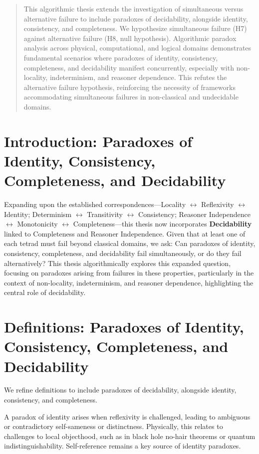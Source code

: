 \begin{abstract}
		This algorithmic thesis extends the investigation of simultaneous versus alternative failure to include paradoxes of decidability, alongside identity, consistency, and completeness. We hypothesize simultaneous failure (H7) against alternative failure (H8, null hypothesis).  Algorithmic paradox analysis across physical, computational, and logical domains demonstrates fundamental scenarios where paradoxes of identity, consistency, completeness, and decidability manifest concurrently, especially with non-locality, indeterminism, and reasoner dependence. This refutes the alternative failure hypothesis, reinforcing the necessity of frameworks accommodating simultaneous failures in non-classical and undecidable domains.
	\end{abstract}
	
	\section{Introduction: Paradoxes of Identity, Consistency, Completeness, and Decidability}
	
	Expanding upon the established correspondences—Locality $\leftrightarrow$ Reflexivity $\leftrightarrow$ Identity; Determinism $\leftrightarrow$ Transitivity $\leftrightarrow$ Consistency; Reasoner Independence $\leftrightarrow$ Monotonicity $\leftrightarrow$ Completeness—this thesis now incorporates \textbf{Decidability} linked to Completeness and Reasoner Independence.  Given that at least one of each tetrad must fail beyond classical domains, we ask: Can paradoxes of identity, consistency, completeness, and decidability fail simultaneously, or do they fail alternatively?  This thesis algorithmically explores this expanded question, focusing on paradoxes arising from failures in these properties, particularly in the context of non-locality, indeterminism, and reasoner dependence, highlighting the central role of decidability.
	
	\section{Definitions: Paradoxes of Identity, Consistency, Completeness, and Decidability}
	
	We refine definitions to include paradoxes of decidability, alongside identity, consistency, and completeness.
	
	\begin{definition}
		A paradox of identity arises when reflexivity is challenged, leading to ambiguous or contradictory self-sameness or distinctness. Physically, this relates to challenges to local objecthood, such as in black hole no-hair theorems or quantum indistinguishability. Self-reference remains a key source of identity paradoxes.
	\end{definition}
	
